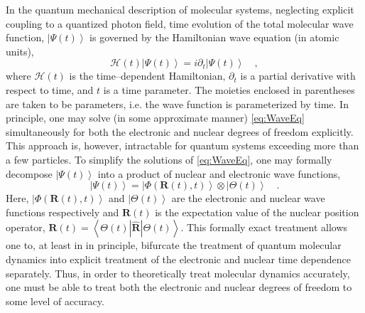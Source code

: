 \documentclass[12pt]{article}
\newcommand{\ket}[1]{\left\vert #1 \right\rangle}         %
\newcommand{\innerop}[3]{\left\langle #1 \left\vert #2 \right\vert #3 \right\rangle}  %
\newcommand*\vc[1]{\boldsymbol{#1}}
\newcommand*\op[1]{\mathcal{#1}}
\begin{document}
In the quantum mechanical description of molecular systems, neglecting explicit
coupling to a quantized photon field, time evolution of the total molecular wave
function, $\ket{\Psi (t)}$ is governed by the Hamiltonian wave equation 
(in atomic units),
\begin{equation}
\op{H}(t) \ket{\Psi (t)} = i\partial_t \ket{\Psi(t)} \quad,
\label{eq:WaveEq}
\end{equation}
where $\op{H}(t)$ is the time--dependent Hamiltonian, $\partial_t$ is a partial
derivative with respect to time, and $t$ is a time parameter.  The moieties
enclosed in parentheses are taken to be parameters, i.e. the wave function is
parameterized by time.  In principle, one may solve (in some approximate manner)
\cref{eq:WaveEq} simultaneously for both the electronic and nuclear degrees of
freedom explicitly. This approach is, however, intractable for quantum systems
exceeding more than a few particles. To simplify the solutions of
\cref{eq:WaveEq}, one may formally decompose $\ket{\Psi (t)}$ into a product of
nuclear and electronic wave functions,
\begin{equation} 
\ket{\Psi (t)} = \ket{\Phi(\vc{R}(t),t)}\otimes\ket{\Theta(t)} 
\quad .  
\label{eq:exactSepElecNuc}
\end{equation} 
Here, $\ket{\Phi(\vc{R}(t),t)}$ and $\ket{\Theta (t)}$ are the electronic and
nuclear wave functions respectively and $\vc{R}(t)$ is the expectation value of
the nuclear position operator, $\vc{R}(t) =
\innerop{\Theta(t)}{\hat{\vc{R}}}{\Theta(t)}$.  
This formally exact treatment\cite{Gross10_PRL123002, Cederbaum08_JCP124101,
Ghosh15_MP1} allows one to, at least in in principle, bifurcate the treatment of
quantum molecular dynamics into explicit treatment of the electronic and nuclear
time dependence separately.  Thus, in order to theoretically treat molecular
dynamics accurately, one must be able to treat both the electronic and nuclear
degrees of freedom to some level of accuracy.
\end{document}
